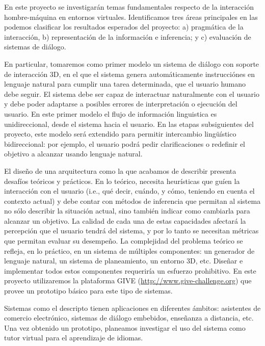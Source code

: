 
En este proyecto se investigar\'an temas fundamentales respecto de la
interacci\'on hombre-m\'aquina en entornos virtuales. Identificamos tres
\'areas principales en las podemos clasificar los resultados esperados
del proyecto: a) pragm\'atica de la interacci\'on, b) representaci\'on
de la informaci\'on e inferencia; y c) evaluaci\'on de sistemas
de di\'alogo.

En particular, tomaremos como primer modelo un sistema de di\'alogo con
soporte de interacci\'on 3D, en el que el sistema genera autom\'aticamente
instrucci\'ones en lenguaje natural para cumplir una tarea determinada, que
el usuario humano debe seguir.   El sistema debe ser capaz de interactuar naturalmente
con el usuario y debe poder adaptarse a posibles errores de interpretaci\'on o
ejecuci\'on del usuario.  En este primer modelo el flujo de informaci\'on
linguistica es unidireccional, desde el sistema hacia el usuario.
En las etapas subsiguientes del proyecto, este modelo ser\'a extendido para
permitir intercambio ling\"u\'istico bidireccional: por ejemplo, el usuario podr\'a
pedir clarificaciones o redefinir el objetivo a alcanzar usando lenguaje natural.

El dise\~no de una arquitectura como la que acabamos de describir presenta
desaf\'ios te\'oricos y pr\'acticos.  En lo te\'orico, necesita
heur\'isticas que gu\'ien la interacci\'on con el usuario (i.e., qu\'e decir,
cu\'ando, y c\'omo, teniendo en cuenta el contexto actual) y debe contar con m\'etodos
de inferencia que permitan al sistema no s\'olo describir la situaci\'on actual, sino
tambi\'en indicar como cambiarla para alcanzar un objetivo.
La calidad de cada una de estas capacidades afectar\'a la percepci\'on que
el usuario tendr\'a del sistema, y por lo tanto se necesitan m\'etricas que
permitan evaluar su desempe\~no.  La complejidad del problema te\'orico se
refleja, en lo pr\'actico, en un sistema de m\'ultiples componentes: un
generador de lenguaje natural, un sistema de planeamiento, un entorno 3D, etc.
Dise\~nar e implementar todos estos componentes requerir\'ia un esfuerzo prohibitivo.
En este proyecto utilizaremos la plataforma GIVE (\url{http://www.give-challenge.org}) que
provee un prototipo b\'asico para este tipo de sistemas.

Sistemas como el descripto tienen aplicaciones en diferentes \'ambitos:
asistentes de comercio electr\'onico, sistemas de di\'alogo embebidos,
ense\~nanza a distancia, etc.  Una vez obtenido
un prototipo, planeamos investigar el uso del sistema como
tutor virtual para el aprendizaje de idiomas.
